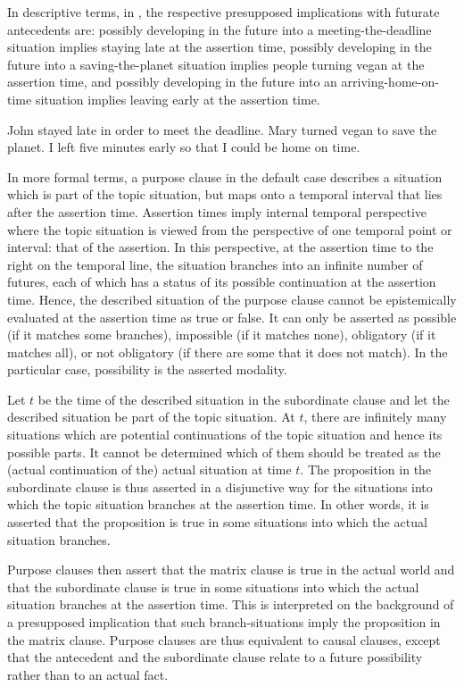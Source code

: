 \documentclass[output=paper,
colorlinks,
citecolor=brown,
newtxmath
]{langscibook}
\begin{document}
In descriptive terms, in , the respective presupposed implications with futurate antecedents are: possibly developing in the future into a meeting-the-deadline situation implies staying late at the assertion time, possibly developing in the future into a saving-the-planet situation implies people turning vegan at the assertion time, and possibly developing in the future into an arriving-home-on-time situation implies leaving early at the assertion time.

\ea\label{ex:Final1}
\ea John stayed late in order to meet the deadline.
\ex Mary turned vegan to save the planet.
\ex I left five minutes early so that I could be home on time.\label{ex:Final1-c}
\z\z

\noindent In more formal terms, a purpose clause in the default case describes a situation which is part of the topic situation, but maps onto a temporal interval that lies after the assertion time. Assertion times imply  internal temporal perspective where the topic situation is viewed from the perspective of one temporal point or interval: that of the assertion. In this perspective, at the assertion time to the right on the temporal line, the situation branches into an infinite number of futures, each of which has a status of its possible continuation at the assertion time. Hence, the described situation of the purpose clause cannot be epistemically evaluated at the assertion time as true or false. It can only be asserted as possible (if it matches some branches), impossible (if it matches none), obligatory (if it matches all), or not obligatory (if there are some that it does not match). In the particular case, possibility is the asserted modality.

Let $t$ be the time of the described situation in the subordinate clause and let the described situation be part of the topic situation. At $t$, there are infinitely many situations which are potential continuations of the topic situation and hence its possible parts. It cannot be determined which of them should be treated as the (actual continuation of the) actual situation at time $t$. The proposition in the subordinate clause is thus asserted in a disjunctive way for the situations into which the topic situation branches at the assertion time. In other words, it is asserted that the proposition is true in some situations into which the actual situation branches.

Purpose clauses then assert that the matrix clause is true in the actual world and that the subordinate clause is true in some situations into which the actual situation branches at the assertion time. This is interpreted on the background of a presupposed implication that such branch-situations imply the proposition in the matrix clause. Purpose clauses are thus equivalent to causal clauses, except that the antecedent and the subordinate clause relate to a future possibility rather than to an actual fact.
\end{document}

